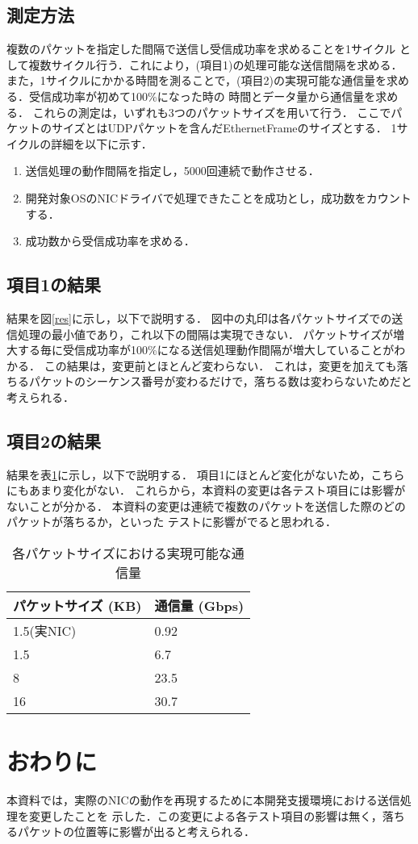 \documentclass[12pt]{jsarticle}
\begin{document}
\subsection{測定方法}
複数のパケットを指定した間隔で送信し受信成功率を求めることを1サイクル
として複数サイクル行う．これにより，(項目1)の処理可能な送信間隔を求める．
また，1サイクルにかかる時間を測ることで，(項目2)の実現可能な通信量を求める．受信成功率が初めて100\%になった時の
時間とデータ量から通信量を求める．
これらの測定は，いずれも3つのパケットサイズを用いて行う．
ここでパケットのサイズとはUDPパケットを含んだEthernetFrameのサイズとする．
1サイクルの詳細を以下に示す．
\begin{enumerate}
    \item 送信処理の動作間隔を指定し，5000回連続で動作させる．
    \item 開発対象OSのNICドライバで処理できたことを成功とし，成功数をカウントする．
    \item 成功数から受信成功率を求める．
\end{enumerate}

\subsection{項目1の結果}
結果を図\ref{res}に示し，以下で説明する．
図中の丸印は各パケットサイズでの送信処理の最小値であり，これ以下の間隔は実現できない．
パケットサイズが増大する毎に受信成功率が100\%になる送信処理動作間隔が増大していることがわかる．
この結果は，変更前とほとんど変わらない．
これは，変更を加えても落ちるパケットのシーケンス番号が変わるだけで，落ちる数は変わらないためだと考えられる．

\subsection{項目2の結果}
結果を表\ref{throughput-nic}に示し，以下で説明する．
項目1にほとんど変化がないため，こちらにもあまり変化がない．
これらから，本資料の変更は各テスト項目には影響がないことが分かる．
本資料の変更は連続で複数のパケットを送信した際のどのパケットが落ちるか，といった
テストに影響がでると思われる．

\begin{table}[h]
    \caption{各パケットサイズにおける実現可能な通信量}
    \label{throughput-nic}
    \begin{center}
        \begin{tabular}{l|l}   \hline \hline 
            パケットサイズ (KB)      & 通信量 (Gbps)  \\ \hline
            1.5(実NIC)               & 0.92           \\
            1.5                      & 6.7            \\
            8                        & 23.5           \\
            16                       & 30.7           \\ \hline
        \end{tabular}
    \end{center}
\end{table}

\section{おわりに}
本資料では，実際のNICの動作を再現するために本開発支援環境における送信処理を変更したことを
示した．この変更による各テスト項目の影響は無く，落ちるパケットの位置等に影響が出ると考えられる．
\end{document}
